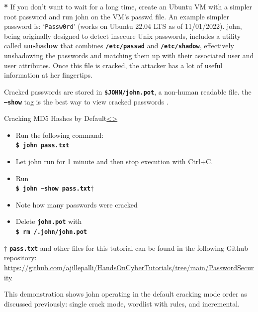\documentclass[12pt]{extarticle}
\newcommand{\code}[1]{\texttt{\bfseries#1}}
\newenvironment{instructionblock}{\Large\bgroup}{\egroup}
\begin{document}
\textbf{*} If you don't want to wait for a long time, create an Ubuntu VM with a simpler root password and run john on the VM's passwd file. An example simpler password is: `\texttt{Passw0rd}' (works on Ubuntu 22.04 LTS as of 11/01/2022).
\vfill
john, being originally designed to detect insecure Unix passwords, includes a utility called \textbf{unshadow} that combines \code{/etc/passwd} and \code{/etc/shadow}, effectively unshadowing the passwords and matching them up with their associated user and user attributes. Once this file is cracked, the attacker has a lot of useful information at her fingertips. \cite{john}

Cracked passwords are stored in \code{\$JOHN/john.pot}, a non-human readable file. the \code{--show} tag is the best way to view cracked passwords \cite{john}.

\pagebreak
\begin{slide}{Cracking MD5 Hashes by Default}{\hyperref[slide 9]{\textless}\hyperref[slide 11]{\textgreater}}

	\begin{instructionblock}
	\begin{itemize}
		\item Run the following command:\\
			\code{\$ john pass.txt}
		\item Let john run for 1 minute and then stop execution with Ctrl+C.
		\item Run \\ \code{\$ john --show pass.txt{\textbf{$\dagger$}}}
		\item Note how many passwords were cracked
		\item Delete \code{john.pot} with\\
		\code{\$ rm \texttildelow/.john/john.pot}
	\end{itemize}
	\end{instructionblock}
\end{slide}
\textbf{$\dagger$} {\code{pass.txt} and other files for this tutorial can be found in the following Github repository: \url{https://github.com/ajillepalli/HandsOnCyberTutorials/tree/main/PasswordSecurity}}\\ 

\vfill

This demonstration shows john operating in the default cracking mode order as discussed previously: single crack mode, wordlist with rules, and incremental.
\end{document}
